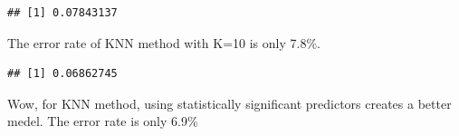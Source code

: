 \documentclass[]{article}
\newenvironment{Shaded}{\begin{snugshade}}{\end{snugshade}}
\newcommand{\KeywordTok}[1]{\textcolor[rgb]{0.13,0.29,0.53}{\textbf{#1}}}
\newcommand{\DataTypeTok}[1]{\textcolor[rgb]{0.13,0.29,0.53}{#1}}
\newcommand{\DecValTok}[1]{\textcolor[rgb]{0.00,0.00,0.81}{#1}}
\newcommand{\StringTok}[1]{\textcolor[rgb]{0.31,0.60,0.02}{#1}}
\newcommand{\OperatorTok}[1]{\textcolor[rgb]{0.81,0.36,0.00}{\textbf{#1}}}
\newcommand{\NormalTok}[1]{#1}
\begin{document}
\begin{verbatim}
## [1] 0.07843137
\end{verbatim}

The error rate of KNN method with K=10 is only 7.8\%.

\begin{Shaded}
\end{Shaded}

\begin{verbatim}
## [1] 0.06862745
\end{verbatim}

Wow, for KNN method, using statistically significant predictors creates
a better medel. The error rate is only 6.9\%
\end{document}
